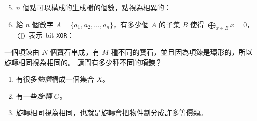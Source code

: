 \documentclass[standalone]{beamer}
\begin{document}
\begin{frame}{}
  \begin{enumerate}[<+->]
    \setcounter{enumi}{4}
  \item $n$ 個點可以構成的生成樹的個數，點視為相異的： \\[2ex]
  \item 給 $n$ 個數字 $A = \{a_1, a_2, \dots, a_n\}$，有多少個 $A$ 的子集 $B$
    使得 $\bigoplus_{x \in B} x = 0$，$\bigoplus$ 表示 bit \texttt{XOR}：
  \end{enumerate}
\end{frame}

\begin{frame}{}
  \begin{problem}[經典問題]
    一個項鍊由 $N$ 個寶石串成，有 $M$ 種不同的寶石，並且因為項鍊是環形的，所以旋轉相同視為相同的。
    請問有多少種不同的項鍊？
  \end{problem}
  \pause

  \begin{enumerate}[<+->]
    \item 有很多\emph{物體}構成一個集合 $X$。
    \item 有一些\emph{旋轉} $G$。
    \item 旋轉相同視為相同，也就是旋轉會把物件劃分成許多等價類。
  \end{enumerate}
\end{frame}

\newcommand{\chain}[6][]{
  \begin{scope}[#1 shift={#2}, w/.style={fill=white}, b/.style={fill=black}, nd/.style={draw, circle}]
    \draw (0, 0) circle (0.3);
    \node[nd] at (0:0.3) [#3] {};
    \node[nd] at (90:0.3) [#4] {};
    \node[nd] at (180:0.3) [#5] {};
    \node[nd] at (270:0.3) [#6] {};
  \end{scope}
}
\end{document}
